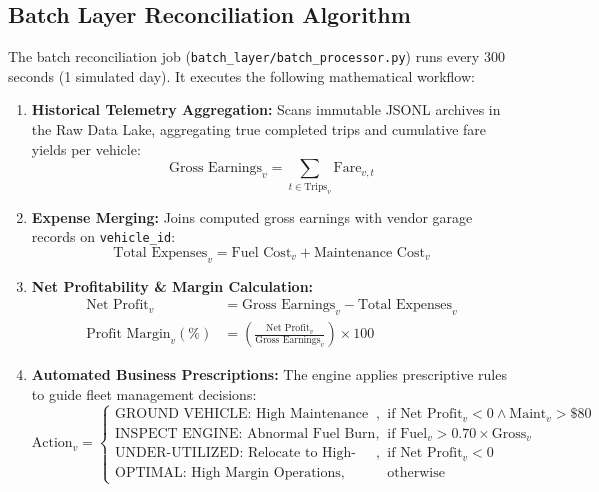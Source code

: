 \documentclass[11pt,a4paper]{article}
\begin{document}
\subsection{Batch Layer Reconciliation Algorithm}
The batch reconciliation job (\texttt{batch\_layer/batch\_processor.py}) runs every 300 seconds (1 simulated day). It executes the following mathematical workflow:
\begin{enumerate}
    \item \textbf{Historical Telemetry Aggregation:} Scans immutable JSONL archives in the Raw Data Lake, aggregating true completed trips and cumulative fare yields per vehicle:
    \begin{equation}
        \text{Gross Earnings}_v = \sum_{t \in \text{Trips}_v} \text{Fare}_{v,t}
    \end{equation}
    \item \textbf{Expense Merging:} Joins computed gross earnings with vendor garage records on \texttt{vehicle\_id}:
    \begin{equation}
        \text{Total Expenses}_v = \text{Fuel Cost}_v + \text{Maintenance Cost}_v
    \end{equation}
    \item \textbf{Net Profitability \& Margin Calculation:}
    \begin{align}
        \text{Net Profit}_v &= \text{Gross Earnings}_v - \text{Total Expenses}_v \\
        \text{Profit Margin}_v (\%) &= \left( \frac{\text{Net Profit}_v}{\text{Gross Earnings}_v} \right) \times 100
    \end{align}
    \item \textbf{Automated Business Prescriptions:} The engine applies prescriptive rules to guide fleet management decisions:
    \begin{equation}
        \text{Action}_v = \begin{cases}
            \text{GROUND VEHICLE: High Maintenance Overhead}, & \text{if } \text{Net Profit}_v < 0 \land \text{Maint}_v > \$80 \\
            \text{INSPECT ENGINE: Abnormal Fuel Burn}, & \text{if } \text{Fuel}_v > 0.70 \times \text{Gross}_v \\
            \text{UNDER-UTILIZED: Relocate to High-Demand Zone}, & \text{if } \text{Net Profit}_v < 0 \\
            \text{OPTIMAL: High Margin Operations}, & \text{otherwise}
        \end{cases}
    \end{equation}
\end{enumerate}
\end{document}
